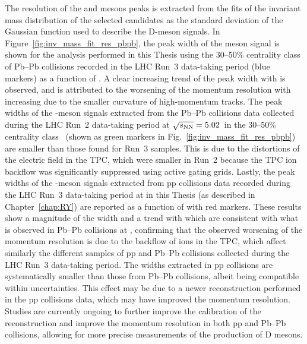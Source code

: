The resolution of the \ds and \dpl mesons peaks is extracted from the fits of the invariant mass distribution of the selected candidates as the standard deviation of the Gaussian function used to describe the D-meson signals. In Figure~\ref{fig:inv_mass_fit_res_pbpb}, the peak width of the \ds meson signal is shown for the analysis performed in this Thesis using the 30--50\% centrality class of Pb--Pb collisions recorded in the LHC Run~3 data-taking period (blue markers) as a function of \pt. A clear increasing trend of the peak width with \pt is observed, and is attributed to the worsening of the momentum resolution with increasing \pt due to the smaller curvature of high-momentum tracks. The peak widths of the \ds-meson signals extracted from the Pb--Pb collisions data collected during the LHC Run~2 data-taking period at $\sqrt{s_\mathrm{NN}}=5.02$~\tev in the 30--50\% centrality class~\cite{ALICE:2021kfc} (shown as green markers in Fig.~\ref{fig:inv_mass_fit_res_pbpb}) are smaller than those found for Run~3 samples. This is due to the distortions of the electric field in the TPC, which were smaller in Run~2 because the TPC ion backflow was significantly suppressed using active gating grids. Lastly, the peak widths of the \ds-meson signals extracted from pp collisions data recorded during the LHC Run~3 data-taking period at \thirteen in this Thesis (as described in Chapter~\ref{chap:RY}) are reported as a function of \pt with red markers. These results show a magnitude of the width and a trend with \pt which are consistent with what is observed in Pb--Pb collisions at \fivenn, confirming that the observed worsening of the momentum resolution is due to the backflow of ions in the TPC, which affect similarly the different samples of pp and Pb--Pb collisions collected during the LHC Run~3 data-taking period. The widths extracted in pp collisions are systematically smaller than those from Pb--Pb collisions, albeit being compatible within uncertainties. This effect may be due to a newer reconstruction performed in the pp collisions data, which may have improved the momentum resolution. Studies are currently ongoing to further improve the calibration of the reconstruction and improve the momentum resolution in both pp and Pb--Pb collisions, allowing for more precise measurements of the production of D mesons. 

